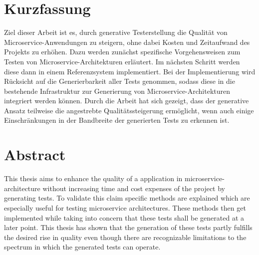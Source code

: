 \documentclass[12pt,a4paper,bibliography=totocnumbered,listof=totocnumbered]{scrartcl}
\begin{document}


\setcounter{page}{1}
\onehalfspacing
{}
\section{Kurzfassung}

Ziel dieser Arbeit ist es, durch generative Testerstellung die Qualität von Microservice-Anwendungen zu steigern, ohne dabei Kosten und Zeitaufwand des Projekts zu erhöhen. Dazu werden zunächst spezifische Vorgehensweisen zum Testen von Microservice-Architekturen erläutert. Im nächsten Schritt werden diese dann in einem Referenzsystem implementiert. Bei der Implementierung wird Rücksicht auf die Generierbarkeit aller Tests genommen, sodass diese in die bestehende Infrastruktur zur Generierung von Microservice-Architekturen integriert werden können. Durch die Arbeit hat sich gezeigt, dass der generative Ansatz teilweise die angestrebte Qualitätssteigerung ermöglicht, wenn auch einige Einschränkungen in der Bandbreite der generierten Tests zu erkennen ist.

\vspace{-1,2em}
\section*{Abstract}

This thesis aims to enhance the quality of a application in microservice-architecture without increasing time and cost expenses of the project by generating tests. To validate this claim specific methods are explained which are especially useful for testing microservice architectures. These methods then get implemented while taking into concern that these tests shall be generated at a later point. This thesis has shown that the generation of these tests partly fulfills the desired rise in quality even though there are recognizable limitations to the spectrum in which the generated tests can operate.
\end{document}
